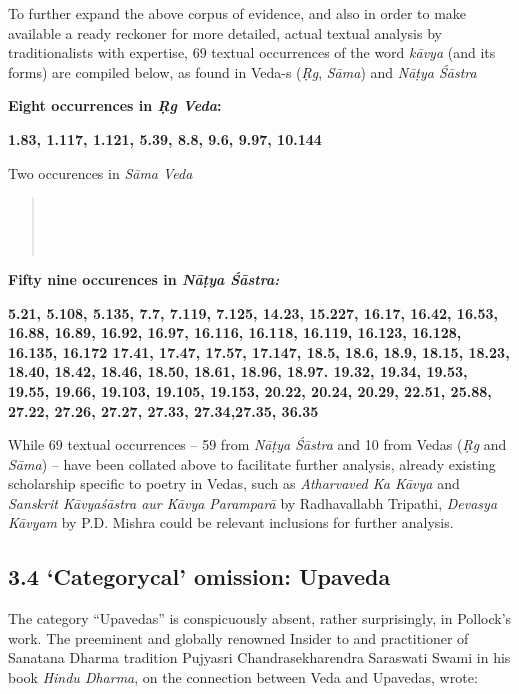 To further expand the above corpus of evidence, and also in order to make available a ready reckoner for more detailed, actual textual analysis by traditionalists with expertise, 69 textual occurrences of the word \textit{kāvya} (and its forms) are compiled below, as found in Veda-s (\textit{Ṛg}, \textit{Sāma}) and \textit{Nāṭya Śāstra}

\textbf{Eight occurrences in \textit{Ṛg Veda}:}

\textbf{1.83, 1.117, 1.121, 5.39, 8.8, 9.6, 9.97, 10.144}

Two occurences in \textit{Sāma Veda} 

\begin{verse}
\\\\\\
\end{verse}

\textbf{Fifty nine occurences in \textit{Nāṭya Śāstra:}}

\textbf{5.21, 5.108, 5.135, 7.7, 7.119, 7.125, 14.23, 15.227, 16.17, 16.42, 16.53, 16.88, 16.89, 16.92, 16.97, 16.116, 16.118, 16.119, 16.123, 16.128, 16.135, 16.172 17.41, 17.47, 17.57, 17.147, 18.5, 18.6, 18.9, 18.15, 18.23, 18.40, 18.42, 18.46, 18.50, 18.61, 18.96, 18.97. 19.32, 19.34, 19.53, 19.55, 19.66, 19.103, 19.105, 19.153, 20.22, 20.24, 20.29, 22.51, 25.88, 27.22, 27.26, 27.27, 27.33, 27.34,27.35, 36.35}

While 69 textual occurrences – 59 from \textit{Nāṭya Śāstra} and 10 from Vedas (\textit{Ṛg} and \textit{Sāma}) – have been collated above to facilitate further analysis, already existing scholarship specific to poetry in Vedas, such as \textit{Atharvaved Ka Kāvya} and \textit{Sanskrit Kāvyaśāstra aur Kāvya Paramparā} by Radhavallabh Tripathi, \textit{Devasya Kāvyam} by P.D. Mishra could be relevant inclusions for further analysis.


\subsection*{3.4 ‘Categorycal’ omission: Upaveda}

The category “Upavedas” is conspicuously absent, rather surprisingly, in Pollock’s work. The preeminent and globally renowned Insider to and practitioner of Sanatana Dharma tradition Pujyasri Chandrasekha\-rendra Saraswati Swami in his book \textit{Hindu Dharma}, on the connection between Veda and Upavedas, wrote:

